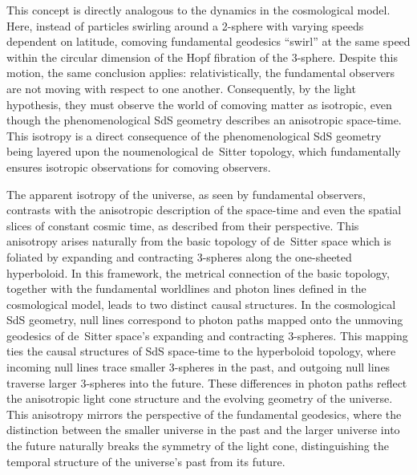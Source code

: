 \documentclass[aps,rmp,groupedaddress,twocolumn,10pt]{revtex4-2}
\begin{document}
This concept is directly analogous to the dynamics in the cosmological model. Here, instead of particles swirling around a 2-sphere with varying speeds dependent on latitude, comoving fundamental geodesics ``swirl'' at the same speed within the circular dimension of the Hopf fibration of the 3-sphere. Despite this motion, the same conclusion applies: relativistically, the fundamental observers are not moving with respect to one another. Consequently, by the light hypothesis, they must observe the world of comoving matter as isotropic, even though the phenomenological SdS geometry describes an anisotropic space-time. This isotropy is a direct consequence of the phenomenological SdS geometry being layered upon the noumenological de~Sitter topology, which fundamentally ensures isotropic observations for comoving observers.

The apparent isotropy of the universe, as seen by fundamental observers, contrasts with the anisotropic description of the space-time and even the spatial slices of constant cosmic time, as described from their perspective. This anisotropy arises naturally from the basic topology of de~Sitter space which is foliated by expanding and contracting 3-spheres along the one-sheeted hyperboloid. In this framework, the metrical connection of the basic topology, together with the fundamental worldlines and photon lines defined in the cosmological model, leads to two distinct causal structures. In the cosmological SdS geometry, null lines correspond to photon paths mapped onto the unmoving geodesics of de~Sitter space's expanding and contracting 3-spheres. This mapping ties the causal structures of SdS space-time to the hyperboloid topology, where incoming null lines trace smaller 3-spheres in the past, and outgoing null lines traverse larger 3-spheres into the future. These differences in photon paths reflect the anisotropic light cone structure and the evolving geometry of the universe. This anisotropy mirrors the perspective of the fundamental geodesics, where the distinction between the smaller universe in the past and the larger universe into the future naturally breaks the symmetry of the light cone, distinguishing the temporal structure of the universe's past from its future.
\end{document}
